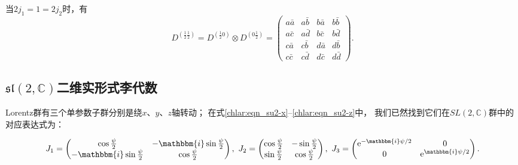 当$2j_1=1= 2j_2$时，有
\begin{equation}
    D^{(\frac{1}{2}\frac{1}{2})} 
    =D^{(\frac{1}{2}0)} \otimes D^{(0\frac{1}{2})}
    =\begin{pmatrix} a \bar{a} & a \bar{b} & b \bar{a} & b \bar{b} \\
        a \bar{c} & a \bar{d} & b \bar{c} & b \bar{d} \\
        c \bar{a} & c \bar{b} & d \bar{a} & d \bar{b} \\
        c \bar{c} & c \bar{d} & d \bar{c} & d \bar{d} 
    \end{pmatrix}  .
\end{equation}




\subsection{$\mathfrak{sl}(2,\mathbb{C})$二维实形式李代数}\label{chlar:sec_sl-LA}

Lorentz群有三个单参数子群分别是绕$x$、$y$、$z$轴转动；
在式\eqref{chlar:eqn_su2-x}--\eqref{chlar:eqn_su2-z}中，
我们已然找到它们在$SL(2,\mathbb{C})$群中的对应表达式为：
\begin{small}
\begin{align*}
    J_1=\begin{pmatrix}
        \cos \frac{\psi}{2} & -\mathbbm{i} \sin \frac{\psi}{2} \\
        -\mathbbm{i} \sin \frac{\psi}{2} & \cos \frac{\psi}{2}
    \end{pmatrix}, \ 
    J_2=\begin{pmatrix}
        \cos \frac{\psi}{2} & -\sin \frac{\psi}{2} \\
        \sin \frac{\psi}{2} & \cos \frac{\psi}{2}
    \end{pmatrix}, \
     J_3=\begin{pmatrix}
        \mathrm{e}^{-\mathbbm{i} \psi / 2} & 0 \\
        0 & \mathrm{e}^{\mathbbm{i} \psi / 2}
   \end{pmatrix}.
\end{align*}  %
\end{small}

